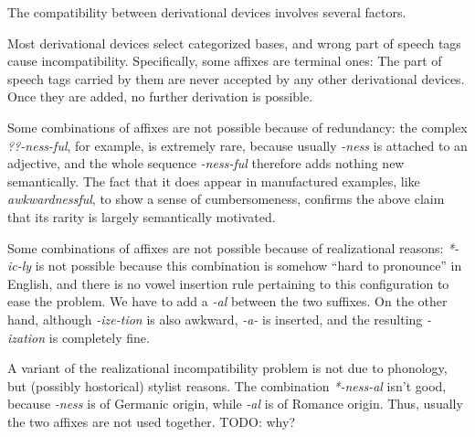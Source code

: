 \documentclass[UTF8, a4paper, oneside, scheme=plain]{ctexrep}
\newcommand{\corpus}[1]{\emph{#1}}
\begin{document}
The compatibility between derivational devices involves several factors.
\begin{enumerate*}
    \item Most derivational devices select categorized bases,
    and wrong part of speech tags cause incompatibility.
    Specifically, some affixes are terminal ones:
    The part of speech tags carried by them are never accepted by any other derivational devices.
    Once they are added,
    no further derivation is possible. %
    \item Some combinations of affixes are not possible because of redundancy:
    the complex \corpus{??-ness-ful},
    for example, is extremely rare,
    because usually \corpus{-ness} is attached to an adjective,
    and the whole sequence \corpus{-ness-ful} therefore adds nothing new semantically.
    The fact that it does appear in manufactured examples, like \corpus{awkwardnessful},
    to show a sense of cumbersomeness,
    confirms the above claim that its rarity is largely semantically motivated.
    \item Some combinations of affixes are not possible because of realizational reasons:
    \corpus{*-ic-ly} is not possible 
    because this combination is somehow ``hard to pronounce'' in English,
    and there is no vowel insertion rule pertaining to this configuration to ease the problem.
    We have to add a \corpus{-al} between the two suffixes.
    On the other hand, although \corpus{-ize-tion} is also awkward,
    \corpus{-a-} is inserted, and the resulting \corpus{-ization} is completely fine.
    \item A variant of the realizational incompatibility problem is 
    not due to phonology, but (possibly hostorical) stylist reasons.
    The combination \corpus{*-ness-al} isn't good,
    because \corpus{-ness} is of Germanic origin,
    while \corpus{-al} is of Romance origin.
    Thus, usually the two affixes are not used together. TODO: why?
\end{enumerate*}
\end{document}
